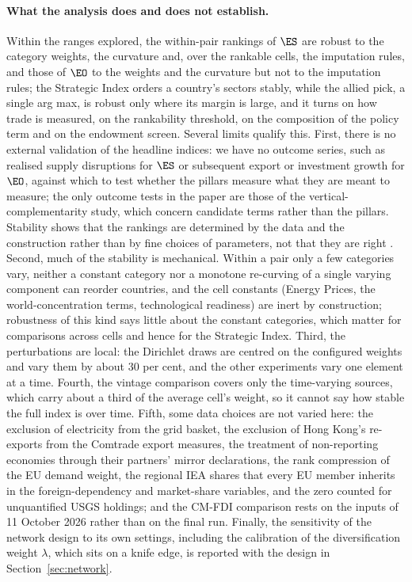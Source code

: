 \paragraph{What the analysis does and does not establish.} Within the ranges explored, the
within-pair rankings of $\ES$ are robust to the category weights, the curvature and, over the
rankable cells, the imputation rules, and those of $\EO$ to the weights and the curvature but
not to the imputation rules; the Strategic Index orders a country's sectors stably, while the
allied pick, a single arg max, is robust only where its margin is large, and it turns on how
trade is measured, on the rankability threshold, on the composition of the policy term and on
the endowment screen. Several limits qualify this. First, there is no external validation of the
headline indices: we have no outcome series, such as realised supply disruptions for $\ES$ or
subsequent export or investment growth for $\EO$, against which to test whether the pillars
measure what they are meant to measure; the only outcome tests in the paper are those of the
vertical-complementarity study, which concern candidate terms rather than the pillars. Stability
shows that the rankings are determined by the data and the construction rather than by fine
choices of parameters, not that they are right \citep{ravallion2012mashup}. Second, much of the
stability is mechanical. Within a pair only a few categories vary, neither a constant category
nor a monotone re-curving of a single varying component can reorder countries, and the cell
constants (Energy Prices, the world-concentration terms, technological readiness) are inert by
construction; robustness of this kind says little about the constant categories, which matter
for comparisons across cells and hence for the Strategic Index. Third, the perturbations are
local: the Dirichlet draws are centred on the configured weights and vary them by about 30 per
cent, and the other experiments vary one element at a time. Fourth, the vintage comparison
covers only the time-varying sources, which carry about a third of the average cell's weight, so
it cannot say how stable the full index is over time. Fifth, some data choices are not varied
here: the exclusion of electricity from the grid basket, the exclusion of Hong Kong's
re-exports from the Comtrade export measures, the treatment of non-reporting economies through
their partners' mirror declarations, the rank compression of the EU demand weight, the regional
IEA shares that every EU member inherits in the foreign-dependency and market-share variables,
and the zero counted for unquantified USGS holdings; and the CM-FDI comparison rests on the
inputs of 11 October 2026 rather than on the final run. Finally, the sensitivity of the network
design to its own settings, including the calibration of the diversification weight $\lambda$,
which sits on a knife edge, is reported with the design in Section~\ref{sec:network}.


